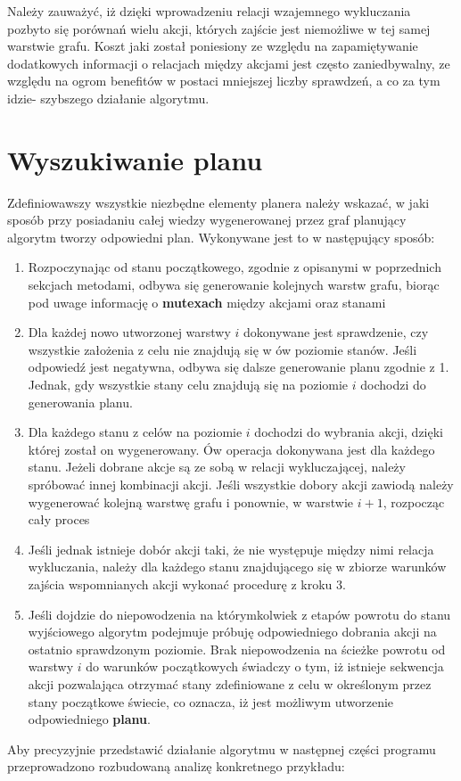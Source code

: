     Należy zauważyć, iż dzięki wprowadzeniu relacji wzajemnego wykluczania pozbyto się porównań wielu akcji, których zajście jest niemożliwe w tej samej 
    warstwie grafu. Koszt jaki został poniesiony ze względu na zapamiętywanie dodatkowych informacji o relacjach między akcjami jest często zaniedbywalny,
    ze względu na ogrom benefitów w postaci mniejszej liczby sprawdzeń, a co za tym idzie- szybszego działanie algorytmu.


\section{Wyszukiwanie planu}
    Zdefiniowawszy wszystkie niezbędne elementy planera należy wskazać, w jaki sposób przy posiadaniu całej wiedzy wygenerowanej przez graf planujący
    algorytm tworzy odpowiedni plan.
    Wykonywane jest to w następujący sposób:
    \begin{enumerate}
        \item Rozpoczynając od stanu początkowego, zgodnie z opisanymi w poprzednich sekcjach metodami, odbywa się generowanie kolejnych warstw grafu,
        biorąc pod uwage informację o \textbf{mutexach} między akcjami oraz stanami
        \item Dla każdej nowo utworzonej warstwy $i$ dokonywane jest sprawdzenie, czy wszystkie założenia z celu nie znajdują się 
        w ów poziomie stanów. Jeśli odpowiedź jest negatywna, odbywa się dalsze generowanie planu zgodnie z 1. Jednak, gdy 
        wszystkie stany celu znajdują się na poziomie $i$ dochodzi do generowania planu.
        \item Dla każdego stanu z celów na poziomie $i$ dochodzi do wybrania akcji, dzięki której został on wygenerowany. 
        Ów operacja dokonywana jest dla każdego stanu. Jeżeli dobrane akcje są ze sobą w relacji wykluczającej, należy spróbować innej 
        kombinacji akcji. Jeśli wszystkie dobory akcji zawiodą należy wygenerować kolejną warstwę grafu i ponownie, w warstwie $i+1$, rozpocząc cały proces
        \item Jeśli jednak istnieje dobór akcji taki, że nie występuje między nimi relacja wykluczania, należy dla każdego stanu 
        znajdującego się w zbiorze warunków zajścia wspomnianych akcji wykonać procedurę z kroku 3. 
        \item Jeśli dojdzie do niepowodzenia na którymkolwiek z etapów powrotu do stanu wyjściowego algorytm podejmuje próbuję odpowiedniego dobrania 
        akcji na ostatnio sprawdzonym poziomie. Brak niepowodzenia na ścieżke powrotu od warstwy $i$ do warunków początkowych świadczy o tym, 
        iż istnieje sekwencja akcji pozwalająca otrzymać stany zdefiniowane z celu w określonym przez stany początkowe świecie, co oznacza, 
        iż jest możliwym utworzenie odpowiedniego \textbf{planu}.
    \end{enumerate}
    Aby precyzyjnie przedstawić działanie algorytmu w następnej części programu przeprowadzono rozbudowaną analizę konkretnego przykładu:

